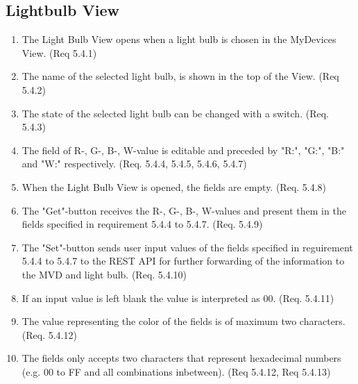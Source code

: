 \documentclass[a4paper]{article}
\newlength{\testlabellength}
\newenvironment{testlist}{\begin{enumerate}[label=\bfseries Test \thesubsection.\arabic* , labelindent=0pt, labelwidth=\testlabellength , leftmargin=2cm]}{\end{enumerate}}
\begin{document}
\begin{appendices}
%
%


\subsection{Lightbulb View}
\begin{testlist}
	\item The Light Bulb View opens when a light bulb is chosen in the MyDevices View. (Req 5.4.1)
	\item The name of the selected light bulb, is shown in the top of the View. (Req 5.4.2)
  
    \item The state of the selected light bulb can be changed with a switch. (Req. 5.4.3)
    
    \item The field of R-, G-, B-, W-value is editable and preceded by "R:", "G:", "B:" and "W:" respectively. (Req. 5.4.4, 5.4.5, 5.4.6, 5.4.7) 

    
	\item When the Light Bulb View is opened, the fields are empty. (Req. 5.4.8)

	\item The "Get"-button receives the R-, G-, B-, W-values and present them in the fields specified in requirement 5.4.4 to 5.4.7. (Req. 5.4.9)

	\item The "Set"-button sends user input values of the fields specified in reguirement 5.4.4 to 5.4.7 to the REST API for further forwarding of the information to the MVD and light bulb. (Req. 5.4.10)

	\item If an input value is left blank the value is interpreted as 00. (Req. 5.4.11)    
    
    
    \item The value representing the color of the fields is of maximum two characters. (Req. 5.4.12)
    
    \item The fields only accepts two characters that represent hexadecimal numbers (e.g. 00 to FF and all combinations inbetween). (Req 5.4.12, Req 5.4.13)
    

\end{testlist}
\end{appendices}
\end{document}
